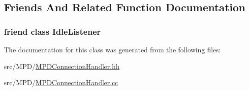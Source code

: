 \subsection{\-Friends \-And \-Related \-Function \-Documentation}
\hypertarget{classMPDConnectionHandler_a227a2ce158de0cd04bf5cfbb1ff9be9c}{
\subsubsection[{\-Idle\-Listener}]{\setlength{\rightskip}{0pt plus 5cm}friend class {\bf \-Idle\-Listener}}}
\label{classMPDConnectionHandler_a227a2ce158de0cd04bf5cfbb1ff9be9c}


\-The documentation for this class was generated from the following files\-:\begin{DoxyCompactItemize}
\item 
src/\-M\-P\-D/\hyperlink{MPDConnectionHandler_8hh}{\-M\-P\-D\-Connection\-Handler.\-hh}\item 
src/\-M\-P\-D/\hyperlink{MPDConnectionHandler_8cc}{\-M\-P\-D\-Connection\-Handler.\-cc}\end{DoxyCompactItemize}
